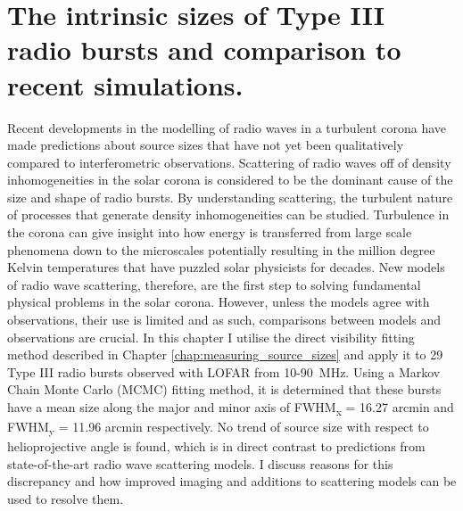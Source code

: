 \doublespacing
\chapter{The intrinsic sizes of Type III radio bursts and comparison to recent simulations.}
\label{chap:observations_vs_theory}
Recent developments in the modelling of radio waves in a turbulent corona have made predictions about source sizes that have not yet been qualitatively compared to interferometric observations. Scattering of radio waves off of density inhomogeneities in the solar corona is considered to be the dominant cause of the size and shape of radio bursts. By understanding scattering, the turbulent nature of processes that generate density inhomogeneities can be studied. Turbulence in the corona can give insight into how energy is transferred from large scale phenomena down to the microscales potentially resulting in the million degree Kelvin temperatures that have puzzled solar physicists for decades. New models of radio wave scattering, therefore, are the first step to solving fundamental physical problems in the solar corona. However, unless the models agree with observations, their use is limited and as such, comparisons between models and observations are crucial. In this chapter I utilise the direct visibility fitting method described in Chapter \ref{chap:measuring_source_sizes} and apply it to 29 Type III radio bursts observed with LOFAR from 10-90~MHz. Using a Markov Chain Monte Carlo (MCMC) fitting method, it is determined that these bursts have a mean size along the major and minor axis of FWHM\textsubscript{x} = 16.27 arcmin and FWHM\textsubscript{y} = 11.96 arcmin respectively. No trend of source size with respect to helioprojective angle is found, which is in direct contrast to predictions from state-of-the-art radio wave scattering models. I discuss reasons for this discrepancy and how improved imaging and additions to scattering models can be used to resolve them.

